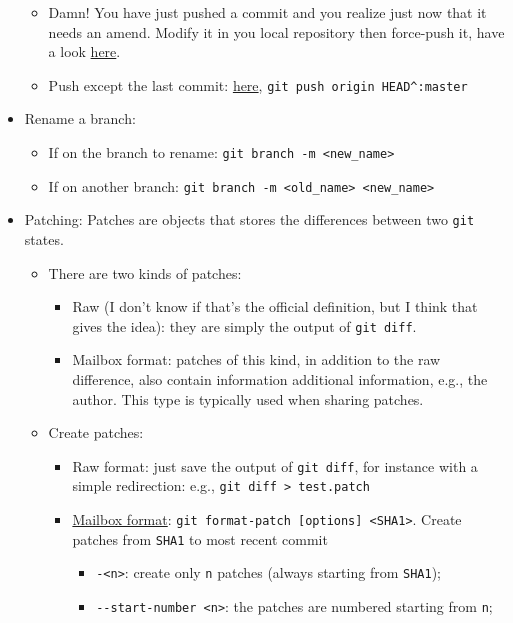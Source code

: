 \documentclass[a4paper,12pt,%
              final%
              ]{article}
\begin{document}
\begin{itemize}
\begin{itemize}
      \item Damn! You have just pushed a commit and you realize just now that it needs an amend. Modify it in you local repository then force-push it, have a look \href{https://stackoverflow.com/questions/179123/how-to-modify-existing-unpushed-commit-messages}{here}.
      \item Push except the last commit: \href{https://stackoverflow.com/questions/8879375/git-push-push-all-commits-except-the-last-one}{here}, \verb|git push origin HEAD^:master|
    \end{itemize}
  \item Rename a branch:
    \begin{itemize}
      \item If on the branch to rename: \verb|git branch -m <new_name>|
      \item If on another branch: \verb|git branch -m <old_name> <new_name>|
    \end{itemize}
  \item Patching: Patches are objects that stores the differences between two \texttt{git} states.
    \begin{itemize}
      \item There are two kinds of patches:
        \begin{itemize}
          \item Raw (I don't know if that's the official definition, but I think that gives the idea): they are simply the output of \verb|git diff|.
          \item Mailbox format: patches of this kind, in addition to the raw difference, also contain information additional information, e.g., the author. This type is typically used when sharing patches.
        \end{itemize}
      \item Create patches:
        \begin{itemize}
          \item Raw format: just save the output of \verb|git diff|, for instance with a simple redirection: e.g., \verb|git diff > test.patch|
          \item \href{https://git-scm.com/docs/git-format-patch}{Mailbox format}: \verb|git format-patch [options] <SHA1>|. Create patches from \texttt{SHA1} to most recent commit
            \begin{itemize}
              \item \texttt{-<n>}: create only \texttt{n} patches (always starting from \texttt{SHA1});
              \item \verb|--start-number <n>|: the patches are numbered starting from \texttt{n};

\end{itemize}
\end{itemize}
\end{itemize}
\end{itemize}
\end{document}
